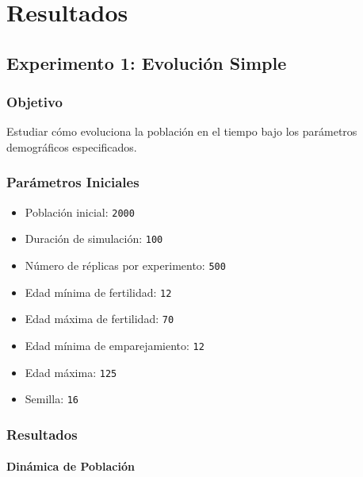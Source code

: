 \documentclass[12pt, a4paper, spanish]{report}
\begin{document}
\chapter{Resultados}

\section{Experimento 1: Evolución Simple}\label{sec:exp1}

\subsection{Objetivo}

Estudiar cómo evoluciona la población en el tiempo bajo los parámetros demográficos especificados.

\subsection{Parámetros Iniciales}

\begin{itemize}
	\item Población inicial: \texttt{2000}
	\item Duración de simulación: \texttt{100}
	\item Número de réplicas por experimento: \texttt{500}
	\item Edad mínima de fertilidad: \texttt{12}
	\item Edad máxima de fertilidad: \texttt{70}
	\item Edad mínima de emparejamiento: \texttt{12}
	\item Edad máxima: \texttt{125}
	\item Semilla: \texttt{16}
\end{itemize}

\subsection{Resultados}

\subsubsection{Dinámica de Población}
\end{document}

